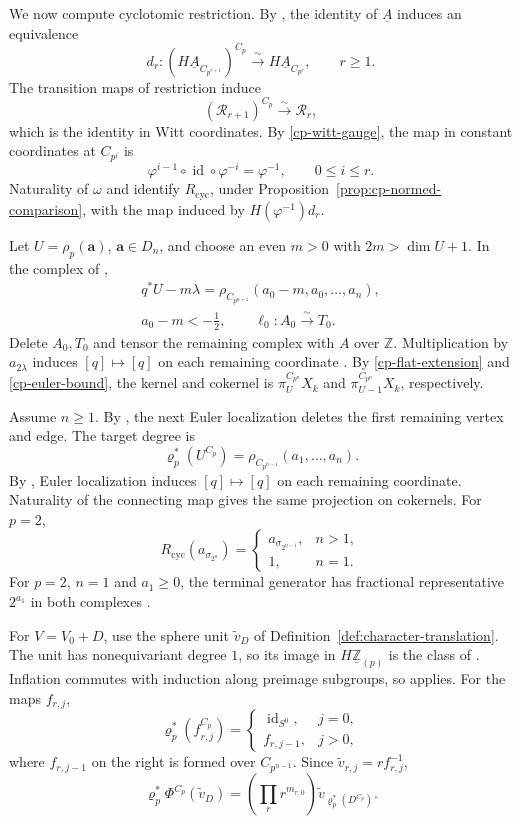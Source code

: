 We now compute cyclotomic restriction.
By \cite[Theorems~5.2--5.3]{Ullman}, the identity of $\underline A$ induces an equivalence
\[
d_r:(H\underline A_{C_{p^{r+1}}})^{C_p}
\xrightarrow{\sim}H\underline A_{C_{p^r}},
\qquad r\ge1.
\]
The transition maps of restriction induce
\[
(\mathcal R_{r+1})^{C_p}\xrightarrow{\sim}\mathcal R_r,
\]
which is the identity in Witt coordinates. By
\eqref{cp-witt-gauge}, the map in constant coordinates at
$C_{p^i}$ is
\[
\varphi^{i-1}\circ\operatorname{id}\circ\varphi^{-i}
=\varphi^{-1},\qquad 0\le i\le r.
\]
Naturality of $\omega$ and \cite[Lemma~5.3]{AN} identify
$R_{\mathrm{cyc}}$, under
Proposition~\ref{prop:cp-normed-comparison}, with the map induced
by $H(\varphi^{-1})d_r$.

Let $U=\rho_p(\mathbf a)$, $\mathbf a\in D_n$, and choose an even
$m>0$ with $2m>\dim U+1$. In the complex of
\cite[(5.5), Theorems~5.9, 5.12 and~6.4]{ZhangHZ},
\[
\begin{gathered}
q^*U-m\lambda
=\rho_{C_{p^{n+1}}}(a_0-m,a_0,\ldots,a_n),\\
a_0-m<-\tfrac12,\qquad \ell_0:A_0\xrightarrow{\sim}T_0.
\end{gathered}
\]
Delete $A_0,T_0$ and tensor the remaining complex with $A$ over
$\mathbb Z$. Multiplication by $a_{2\lambda}$ induces
$[q]\mapsto[q]$ on each remaining coordinate
\cite[(A.46)--(A.52)]{ZhangHZ}.
By \eqref{cp-flat-extension} and \eqref{cp-euler-bound},
the kernel and cokernel is $\pi_U^{C_{p^n}}X_k$ and
$\pi_{U-1}^{C_{p^n}}X_k$, respectively.

Assume $n\ge1$. By
\cite[Theorem~4.7 and Corollary~4.35]{ZhangHZ},
the next Euler localization deletes the first remaining
vertex and edge. The target degree is
\[
\varrho_p^*(U^{C_p})
=\rho_{C_{p^{n-1}}}(a_1,\ldots,a_n).
\]
By \cite[(A.46)--(A.52)]{ZhangHZ}, Euler localization induces
$[q]\mapsto[q]$ on each remaining coordinate.
Naturality of the connecting map gives the same projection
on cokernels. For $p=2$,
\[
R_{\mathrm{cyc}}(a_{\sigma_{2^n}})
=\begin{cases}
a_{\sigma_{2^{n-1}}},&n>1,\\
1,&n=1.
\end{cases}
\]
For $p=2$, $n=1$ and $a_1\ge0$, the terminal generator has
fractional representative $2^{a_1}$ in both complexes
\cite[(5.5), (A.52)]{ZhangHZ}.

For $V=V_0+D$, use the sphere unit $\widetilde v_D$ of
Definition~\ref{def:character-translation}.
The unit has nonequivariant degree $1$, so its image
in $H\underline{\mathbb Z}_{(p)}$ is the class of
\cite[Lemma~2.6]{ZhangHZ}.
Inflation commutes with induction along preimage subgroups,
so \cite[(2.7)]{ZhangHZ} applies.
For the maps $f_{r,j}$,
\[
\varrho_p^*(f_{r,j}^{C_p})
=\begin{cases}
\operatorname{id}_{S^0},&j=0,\\
f_{r,j-1},&j>0,
\end{cases}
\]
where $f_{r,j-1}$ on the right is formed over $C_{p^{n-1}}$.
Since $\widetilde v_{r,j}=r f_{r,j}^{-1}$,
\[
\varrho_p^*\Phi^{C_p}(\widetilde v_D)
=\left(\prod_r r^{m_{r,0}}\right)
\widetilde v_{\varrho_p^*(D^{C_p})}.
\]

